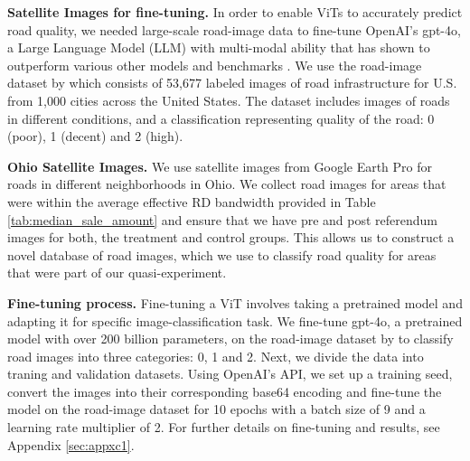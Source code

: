 
{\bf Satellite Images for fine-tuning.} In order to enable ViTs to accurately predict road quality, we needed large-scale road-image data to fine-tune OpenAI's gpt-4o, a Large Language Model (LLM) with multi-modal ability that has shown to outperform various other models and benchmarks \citep{achiam2023gpt}. We use the road-image dataset by \cite{brewer2021} which consists of 53,677 labeled images of road infrastructure for U.S. from 1,000 cities across the United States. The dataset includes images of roads in different conditions, and a classification representing quality of the road: 0 (poor), 1 (decent) and 2 (high). 

{\bf Ohio Satellite Images.} We use satellite images from Google Earth Pro for roads in different neighborhoods in Ohio. We collect road images for areas that were within the average effective RD bandwidth provided in Table \ref{tab:median_sale_amount} and ensure that we have pre and post referendum images for both, the treatment and control groups. This allows us to construct a novel database of road images, which we use to classify road quality for areas that were part of our quasi-experiment. 


{\bf Fine-tuning process.} Fine-tuning a ViT involves taking a pretrained model and adapting it for specific image-classification task. We fine-tune gpt-4o, a pretrained model with over 200 billion parameters, on the road-image dataset by \cite{brewer2021} to classify road images into three categories: 0, 1 and 2. Next, we divide the data into traning and validation datasets. Using OpenAI's API, we set up a training seed, convert the images into their corresponding base64 encoding and fine-tune the model on the road-image dataset for 10 epochs with a batch size of 9 and a learning rate multiplier of 2. For further details on fine-tuning and results, see Appendix \ref{sec:appxc1}. 


